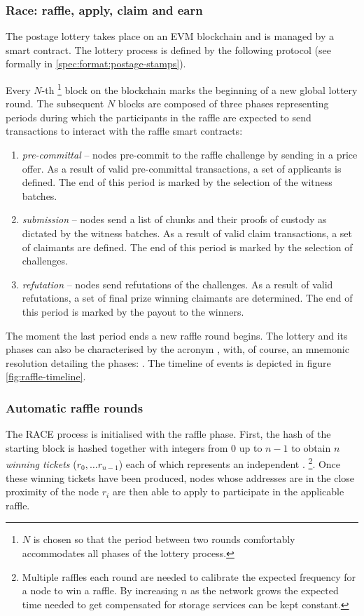 \subsubsection{Race: raffle, apply, claim and earn}

The postage lottery takes place on an EVM blockchain and is managed by a smart contract. The lottery process is defined by the following protocol (see formally in \ref{spec:format:postage-stamps}). 

Every $N$-th%
%
\footnote{$N$ is chosen so that the period  between two rounds comfortably accommodates all phases of the lottery process.}
%
block on the blockchain marks the beginning of a new global lottery round.
The subsequent $N$ blocks are composed of three phases representing periods during which the participants in the raffle are expected to send transactions to interact with the raffle smart contracts: 

\begin{enumerate}
\item \emph{pre-committal} -- nodes pre-commit to the raffle challenge by sending in a price offer. As a result of valid pre-committal transactions, a set of applicants is defined. The end of this period is marked by the selection of the witness batches.
\item \emph{submission} -- nodes send a list of chunks and their proofs of custody as dictated by the witness batches. As a result of valid claim transactions, a set of claimants are defined. The end of this period is marked by the selection of challenges.
\item \emph{refutation} -- nodes send refutations of the challenges. As a result of valid refutations, a set of final prize winning claimants are determined. The end of this period is marked by the payout to the winners.
\end{enumerate}

The moment the last period ends a new raffle round begins. The lottery and its phases can also be characterised by the acronym , with, of course, an mnemonic resolution detailing the phases: . The timeline of events is depicted in figure \ref{fig:raffle-timeline}.


\subsubsection{Automatic raffle rounds}

The RACE process is initialised with the raffle phase. First, the hash of the starting block is hashed together with integers from $0$ up to $n-1$ to obtain $n$ \emph{winning tickets} ($r_0, \ldots r_{n-1}$) each of which represents an independent .%
%
\footnote{Multiple raffles each round are needed to calibrate the expected frequency for a node to win a raffle. By increasing $n$ as the network grows the expected time needed to get compensated for storage services can be kept constant.}. 
%
Once these winning tickets have been produced, nodes whose addresses are in the close proximity of the node $r_i$ are then able to apply to participate in the applicable raffle.


